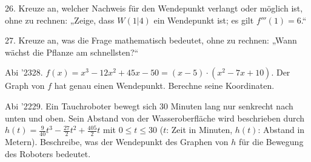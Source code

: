 \documentclass[11pt]{article}
\begin{document}
\begin{pfaufg}{}{26.}{}
Kreuze an, welcher Nachweis für den Wendepunkt verlangt oder möglich ist, ohne zu rechnen: „Zeige, dass $W(1 | 4)$ ein Wendepunkt ist; es gilt $f'''(1) = 6$.“ 
\end{pfaufg}
\begin{pfaufg}{}{27.}{}
Kreuze an, was die Frage mathematisch bedeutet, ohne zu rechnen: „Wann wächst die Pflanze am schnellsten?“ 
\end{pfaufg}
\pfgruppe{}
\begin{pfaufg}{Abi ’23}{28.}{}
$f(x) = x^3 - 12x^2 + 45x - 50 = (x - 5)\cdot(x^2 - 7x + 10)$. Der Graph von $f$ hat genau einen Wendepunkt. Berechne seine Koordinaten.
\end{pfaufg}
\pfgruppe{}
\begin{pfaufg}{Abi ’22}{29.}{}
Ein Tauchroboter bewegt sich 30 Minuten lang nur senkrecht nach unten und oben. Sein Abstand von der Wasseroberfläche wird beschrieben durch $h(t) = \tfrac{9}{40}t^3 - \tfrac{27}{2}t^2 + \tfrac{405}{2}t$ mit $0 \le t \le 30$ ($t$: Zeit in Minuten, $h(t)$: Abstand in Metern). Beschreibe, was der Wendepunkt des Graphen von $h$ für die Bewegung des Roboters bedeutet.
\par\smallskip\noindent {}\par
{}
\end{pfaufg}
\pfgruppe{}
\end{document}
